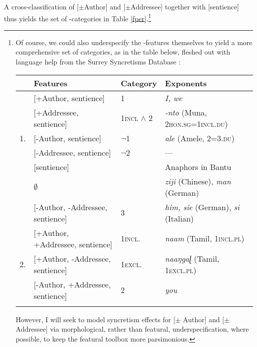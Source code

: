 \documentclass[output=paper, modfonts, nonflat]{langsci/langscibook}
\begin{document}
A cross-classification of [$\pm$Author] and [$\pm$Addressee] together
with [sentience] thus yields the set of \person-categories in Table
\ref{fper}.\footnote{Of course, we could also underspecify the
  \person-features themselves to yield a more comprehensive set of
  categories, as in the table below, fleshed out with language help
  from the Surrey Syncretisms Database \citep{surrey:2002}:

      \begin{tabular}{llll}
      \lsptoprule
      & \textbf{Features} & \textbf{Category} & \textbf{Exponents}\\  
      \midrule
   &   {[+Author, sentience]} & \textsc{1} & \textit{I, we}\\
    &   {[+Addressee, sentience]} & \textsc{1incl} $\wedge$ \textsc{2} & \textit{-nto} (Muna, \textsc{2hon.sg=1incl.du})\\   
   1. &  {[-Author, sentience]} & \textsc{$\neg$1} & \textit{ale} (Amele, \textsc{2=3.du})\\
        &   {[-Addressee, sentience]} & \textsc{$\neg$2} & ---\\
        & {[sentience]} & {} & Anaphors in Bantu\\
        &   $\emptyset$ & \nul{} & \textit{ziji} (Chinese),
                                     \textit{man} (German)\\
\midrule
  &     {[-Author, -Addressee, sentience]} & \textsc{3} & \textit{him,
                                                       sie} (German), \textit{si} (Italian)\\
     &  {[+Author, +Addressee, sentience]} & \textsc{1incl.} & \textit{naam}
                                                  (Tamil, \textsc{1incl.pl})\\
   2. &   {[+Author, -Addressee, sentience]} &  \textsc{1excl.} &
                                                   \textit{naaŋgaɭ}
                                                   (Tamil, \textsc{1excl.pl})\\
        &   {[-Author, +Addressee, sentience]} & 2 & \textit{you}\\
          \lspbottomrule
      \end{tabular}
      
      However, I will seek to model syncretism effects for [$\pm$
      Author] and [$\pm$Addressee] via morphological, rather than
      featural, underspecification, where possible, to keep the
      featural toolbox more parsimonious.}
\end{document}
